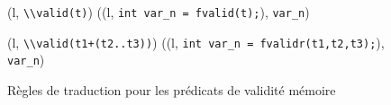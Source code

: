 \begin{figure*}[h!]
  \scriptsize{
    {\myinference[$\pi$-valid]
      {}
      {(l, \mbox{\lstinline'\\valid(t)'}) 
        ((l, \mbox{\lstinline'int var_n = fvalid(t);'}),
        \mbox{\lstinline'var_n'})
      }
    }

    {
      {
        (l, \mbox{\lstinline'\\valid(t1+(t2..t3))'}) 
        ((l, \mbox{\lstinline'int var_n = fvalidr(t1,t2,t3);'}),
        \mbox{\lstinline'var_n'})
      }
    }
  }
  \caption{Règles de traduction pour les prédicats de validité mémoire}
  \label{fig:valid}
\end{figure*}
